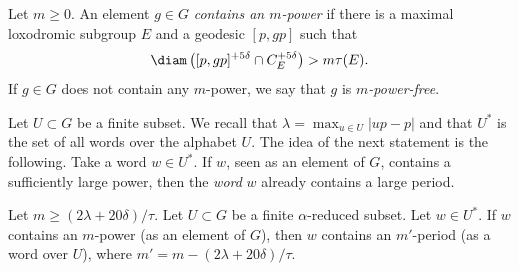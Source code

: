 \begin{df}
\label{def: power-free}
Let $m \geq 0$.
An element $g\in G$ \emph{contains an $m$-power} if there is a maximal loxodromic subgroup $E$ and a geodesic $[p,gp]$ such that
\begin{equation*}
\diam \left( [p,gp]^{+5\delta} \cap C_E^{+5\delta}\right) > m \tau(E).
\end{equation*}
If $g\in G$ does not contain any $m$-power, we say that $g$ is \emph{$m$-power-free}.
\end{df}

Let $U\subset G$ be a finite subset.
We recall that $\lambda = \max_{u\in U}|up-p|$ and that $U^*$ is the set of all words over the alphabet $U$.
The idea of the next statement is the following.
Take a word $w \in U^*$.
If $w$, seen as an element of $G$, contains a sufficiently large power, then the \emph{word} $w$ already contains a large period.

\begin{prop}
\label{P: proper power vs strong period}
Let $m \geq (2\lambda + 20\delta)/\tau$.
Let $U\subset G$ be a finite $\alpha$-reduced subset.
Let $w\in U^*$.
If $w$ contains an $m$-power (as an element of $G$), then $w$ contains an $m'$-period (as a word over $U$), where $m' = m - (2\lambda + 20\delta)/\tau$.
\end{prop}

